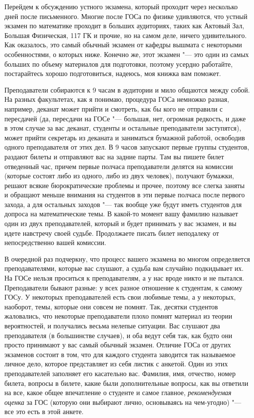 Перейдем к обсуждению устного экзамена, который проходит через несколько дней после письменного. Многие после ГОСа по физике удивляются, что устный экзамен по математике проходит в больших аудиториях, таких как Актовый Зал, Большая Физическая, 117 ГК и прочие, но на самом деле, ничего удивительного. Как оказалось, это самый обычный экзамен от кафедры вышмата с некоторыми особенностями, о которых ниже. Конечно же, этот экзамен "--- это один из самых больших по объему материалов для подготовки, поэтому усердно работайте, постарайтесь хорошо подготовиться, надеюсь, моя книжка вам поможет.

Преподаватели собираются к 9 часам в аудитории и мило общаются между собой. На разных факультетах, как я понимаю, процедура ГОСа немножко разная, например, деканат может прийти и смотреть, как бы кого не отправили с пересдачей (да, пересдачи на ГОСе "--- большая, нет, огромная редкость, и даже в этом случае за вас деканат, студенты и остальные преподаватели заступятся), может прийти секретарь из деканата и заниматься бумажной работой, освободив одного преподавателя от этих дел. В 9 часов запускают первые группы студентов, раздают билеты и отправляют вас на задние парты. Там вы пишете билет отведенный час, причем первые полчаса  преподаватели делятся на комиссии (которые состоят либо из одного, либо из двух человек), получают бумажки, решают всякие бюрократические проблемы и прочее, поэтому все слегка заняты и обращают меньше внимания на студентов в эти первые полчаса после первого захода, а для остальных заходов "--- так вообще уже будут иметь студентов для допроса на математические темы. В какой-то момент вашу фамилию называет один из двух преподавателей, который и будет принимать у вас экзамен, и вы идете навстречу своей судьбе. Продолжаете писать билет неподалеку от непосредственно вашей комиссии.

В очередной раз подчеркну, что процесс вашего экзамена во многом определяется преподавателями, которые вас слушают, а судьба вам случайно подкидывает их. На ГОСе нельзя проситься к преподавателям, а у нас вроде никто и не пытался. Преподаватели бывают разные: у всех разное отношение к студентам, к самому ГОСу. У некоторых преподавателей есть свои любимые темы, а у некоторых, наоборот, темы, которые они совсем не помнят. Так, десятки студентов жаловались, что некоторые преподаватели плохо помнят материал из теории вероятностей, и получались весьма нелепые ситуации. Вас слушают два преподавателя (в большинстве случаев), и оба ведут себя так, как будто они просто принимают у вас самый обычный экзамен. Отличие ГОСа от других экзаменов состоит в том, что для каждого студента заводится так называемое личное дело, которое представляет из себя листик с анкетой. Один из этих преподавателей заполняет его касательно вас. Фамилия, имя, отчество, номер билета, вопросы в билете, какие были дополнительные вопросы, как вы ответили на все, какое общее впечатление о студенте и самое главное, \textit{рекомендуемая оценка} за ГОС (которую они выбирают лично, основываясь на чем-угодно) "--- все это есть в этой анкете. 

